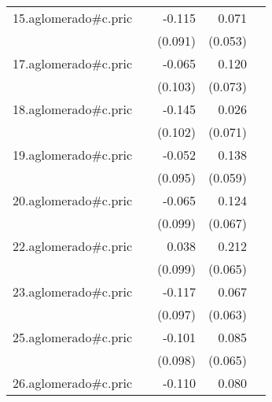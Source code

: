 {\begin{longtable}{l*{4}{D{.}{.}{-1}}}
\addlinespace
15.aglomerado#c.pric&                     &      -0.115         &       0.071         &                     \\
            &                     &     (0.091)         &     (0.053)         &                     \\
\addlinespace
17.aglomerado#c.pric&                     &      -0.065         &       0.120         &                     \\
            &                     &     (0.103)         &     (0.073)         &                     \\
\addlinespace
18.aglomerado#c.pric&                     &      -0.145         &       0.026         &                     \\
            &                     &     (0.102)         &     (0.071)         &                     \\
\addlinespace
19.aglomerado#c.pric&                     &      -0.052         &       0.138\sym{*}  &                     \\
            &                     &     (0.095)         &     (0.059)         &                     \\
\addlinespace
20.aglomerado#c.pric&                     &      -0.065         &       0.124         &                     \\
            &                     &     (0.099)         &     (0.067)         &                     \\
\addlinespace
22.aglomerado#c.pric&                     &       0.038         &       0.212\sym{**} &                     \\
            &                     &     (0.099)         &     (0.065)         &                     \\
\addlinespace
23.aglomerado#c.pric&                     &      -0.117         &       0.067         &                     \\
            &                     &     (0.097)         &     (0.063)         &                     \\
\addlinespace
25.aglomerado#c.pric&                     &      -0.101         &       0.085         &                     \\
            &                     &     (0.098)         &     (0.065)         &                     \\
\addlinespace
26.aglomerado#c.pric&                     &      -0.110         &       0.080         &                     \\

\end{longtable}}
